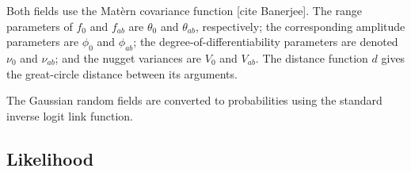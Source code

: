 Both fields use the Mat\`ern covariance function [cite Banerjee]. The range parameters of $f_0$ and $f_{ab}$ are $\theta_0$ and $\theta_{ab}$, respectively; the corresponding amplitude parameters are $\phi_0$ and $\phi_{ab}$; the degree-of-differentiability parameters are denoted $\nu_{0}$ and $\nu_{ab}$; and the nugget variances are $V_0$ and $V_{ab}$. The distance function $d$ gives the great-circle distance between its arguments.

The Gaussian random fields are converted to probabilities using the standard inverse logit link function.

\subsection*{Likelihood} %
\label{sec:likelihood}


